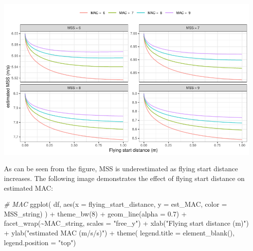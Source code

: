 \documentclass[fleqn,10pt,lineno]{wlpeerj} %
\newenvironment{Shaded}{\begin{snugshade}}{\end{snugshade}}
\newcommand{\AttributeTok}[1]{\textcolor[rgb]{0.77,0.63,0.00}{#1}}
\newcommand{\CommentTok}[1]{\textcolor[rgb]{0.56,0.35,0.01}{\textit{#1}}}
\newcommand{\DecValTok}[1]{\textcolor[rgb]{0.00,0.00,0.81}{#1}}
\newcommand{\FloatTok}[1]{\textcolor[rgb]{0.00,0.00,0.81}{#1}}
\newcommand{\FunctionTok}[1]{\textcolor[rgb]{0.00,0.00,0.00}{#1}}
\newcommand{\NormalTok}[1]{#1}
\newcommand{\SpecialCharTok}[1]{\textcolor[rgb]{0.00,0.00,0.00}{#1}}
\newcommand{\StringTok}[1]{\textcolor[rgb]{0.31,0.60,0.02}{#1}}
\begin{document}
\begin{center}\includegraphics[width=1\linewidth]{paper_files/figure-latex/unnamed-chunk-34-1} \end{center}

As can be seen from the figure, MSS is underestimated as flying start distance increases. The following image demonstrates the effect of flying start distance on estimated MAC:

\begin{Shaded}
\begin{Highlighting}[]
\CommentTok{\# MAC}
\FunctionTok{ggplot}\NormalTok{(}
\NormalTok{  df,}
  \FunctionTok{aes}\NormalTok{(}\AttributeTok{x =}\NormalTok{ flying\_start\_distance, }\AttributeTok{y =}\NormalTok{ est\_MAC, }\AttributeTok{color =}\NormalTok{ MSS\_string)}
\NormalTok{) }\SpecialCharTok{+}
  \FunctionTok{theme\_bw}\NormalTok{(}\DecValTok{8}\NormalTok{) }\SpecialCharTok{+}
  \FunctionTok{geom\_line}\NormalTok{(}\AttributeTok{alpha =} \FloatTok{0.7}\NormalTok{) }\SpecialCharTok{+}
  \FunctionTok{facet\_wrap}\NormalTok{(}\SpecialCharTok{\textasciitilde{}}\NormalTok{MAC\_string, }\AttributeTok{scales =} \StringTok{"free\_y"}\NormalTok{) }\SpecialCharTok{+}
  \FunctionTok{xlab}\NormalTok{(}\StringTok{"Flying start distance (m)"}\NormalTok{) }\SpecialCharTok{+}
  \FunctionTok{ylab}\NormalTok{(}\StringTok{"estimated MAC (m/s/s)"}\NormalTok{) }\SpecialCharTok{+}
  \FunctionTok{theme}\NormalTok{(}
    \AttributeTok{legend.title =} \FunctionTok{element\_blank}\NormalTok{(), }
    \AttributeTok{legend.position =} \StringTok{"top"}\NormalTok{)}
\end{Highlighting}
\end{Shaded}
\end{document}
